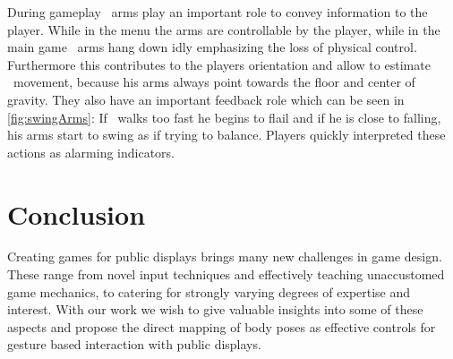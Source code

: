 \documentclass{chi-ext}
\begin{document}
During gameplay \eds\ arms play an important role to convey information to the player. While in the menu the arms are controllable by the player, while in the main game \eds\ arms hang down idly emphasizing the loss of physical control. Furthermore this contributes to the players orientation and allow to estimate \eds\ movement, because his arms always point towards the floor and center of gravity. They also have an important feedback role which can be seen in \autoref{fig:swingArms}: If \ed\ walks too fast he begins to flail and if he is close to falling, his arms start to swing as if trying to balance. Players quickly interpreted these actions as alarming indicators.
%
\section{Conclusion}
%
Creating games for public displays brings many new challenges in game design. These range from novel input techniques and effectively teaching unaccustomed game mechanics, to catering for strongly varying degrees of expertise and interest. With our work we wish to give valuable insights into some of these aspects and propose the direct mapping of body poses as effective controls for gesture based interaction with public displays. 

\end{document}
